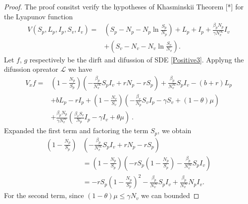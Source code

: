 \begin{proof}
	The proof consitst verify the hypotheses of Khasminskii Theorem [*] for 
	the Lyapunov function
	\begin{align*}
		V(S_p, L_p, I_p, S_v, I_v) 
			=& 
				\left(
					S_p - N_p - N_p 
					\ln 
					\frac{S_p}{N_p}
				\right) + 
				L_p + I_p + 
				\frac{\beta_p N_p}{\gamma N^\infty_v} I_v
			\\
			&+
				\left(
					S_v - N_v - N_v 
					\ln
					\frac{S_v}{N_v}
				\right).
	\end{align*}
	Let $f$, $g$ respectively be the dirft and difussion of SDE 
	\eqref{Positive3}. Applyng the difussion opreator $\mathcal{L}$ we have
	\begin{equation}
		\begin{aligned}
			V_x f 
				=&
					\left(
						1 - 
						\frac{N_p}{S_p}
					\right)
					\left(
						-
						\frac{\beta_p}{N^\infty_v} S_p I_v + 
						r N_p - r S_p
					\right) + 
					\frac{\beta_p}{N^\infty_v} S_p I_v - 
					(b + r) L_p
				\\
				&+
					b L_p - r I_p + 
					\left(
						1 - 
						\frac{N_v}{S_v}
					\right)
					\left( 
						-\frac{\beta_v}{N_p} S_v I_p - 
						\gamma S_v + 
						(1 - \theta) \mu 
					\right)
				\\
				&+
					\frac{\beta_p N_p}{\gamma N ^ \infty_v}
					\left(
						\frac{\beta_v S_v}{N_p}
						I_p - \gamma I_v + 
						\theta \mu
					\right)  \ .
		\end{aligned}
	\end{equation}
	Expanded the first term and factoring the term $S_p$, we obtain
	\begin{equation}
		\label{theorem2term1}
		\begin{aligned}
			\left(
				1 - \frac{N_p}{S_p}
			\right)
			&
			\left(
				-\frac{\beta_p}{N^\infty_v} S_p I_v +
				r N_p - r S_p
			\right) 	
			\\
			&=
				\left(
						1 - \frac{N_p}{S_p}
					\right)
					\left(- r S_p 
						\left(
							1 - \frac{N_p}{S_p}
						\right) - 
						\frac{\beta_p}{N^\infty_v} S_p I_v
					\right)
			\\
			&=
				- r S_p 
				\left(
					1 - 
					\frac{N_p}{S_p}
				\right) ^ 2 - 
				\frac{\beta_p}{N ^ \infty_v} S_p I_v + 
				\frac{\beta_p}{N ^ \infty_v} N_p I_v .
		\end{aligned}
	\end{equation}
	For the second term, since $(1-\theta)\mu\leq \gamma N_v$ we can bounded 

\end{proof}
